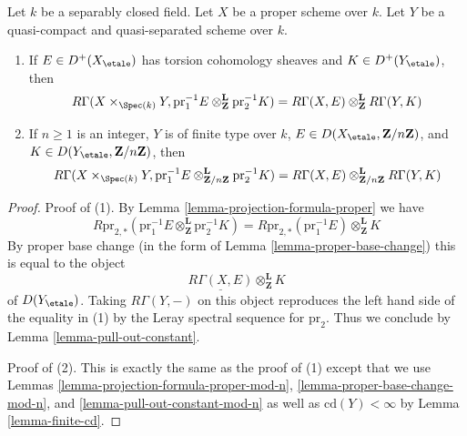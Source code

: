 \begin{lemma}
\label{lemma-kunneth-one-proper}
Let $k$ be a separably closed field. Let $X$ be a proper scheme over $k$.
Let $Y$ be a quasi-compact and quasi-separated scheme over $k$.
\begin{enumerate}
\item If $E \in D^+(X_\etale)$ has torsion cohomology sheaves and
$K \in D^+(Y_\etale)$, then
$$
R\Gamma(X \times_{\Spec(k)} Y,
\text{pr}_1^{-1}E
\otimes_\mathbf{Z}^\mathbf{L}
\text{pr}_2^{-1}K
)
=
R\Gamma(X, E)
\otimes_\mathbf{Z}^\mathbf{L}
R\Gamma(Y, K)
$$
\item If $n \geq 1$ is an integer, $Y$ is of finite type over $k$,
$E \in D(X_\etale, \mathbf{Z}/n\mathbf{Z})$, and
$K \in D(Y_\etale, \mathbf{Z}/n\mathbf{Z})$, then
$$
R\Gamma(X \times_{\Spec(k)} Y,
\text{pr}_1^{-1}E
\otimes_{\mathbf{Z}/n\mathbf{Z}}^\mathbf{L}
\text{pr}_2^{-1}K
)
=
R\Gamma(X, E)
\otimes_{\mathbf{Z}/n\mathbf{Z}}^\mathbf{L}
R\Gamma(Y, K)
$$
\end{enumerate}
\end{lemma}

\begin{proof}
Proof of (1). By Lemma \ref{lemma-projection-formula-proper} we have
$$
R\text{pr}_{2, *}(
\text{pr}_1^{-1}E
\otimes_\mathbf{Z}^\mathbf{L}
\text{pr}_2^{-1}K) =
R\text{pr}_{2, *}(\text{pr}_1^{-1}E)
\otimes_\mathbf{Z}^\mathbf{L}
K
$$
By proper base change (in the form of Lemma \ref{lemma-proper-base-change})
this is equal to the object
$$
\underline{R\Gamma(X, E)}
\otimes_\mathbf{Z}^\mathbf{L}
K
$$
of $D(Y_\etale)$. Taking $R\Gamma(Y, -)$ on this object reproduces the
left hand side of the equality in (1) by the Leray spectral sequence
for $\text{pr}_2$. Thus we conclude by
Lemma \ref{lemma-pull-out-constant}.

\medskip\noindent
Proof of (2). This is exactly the same as the proof of (1)
except that we use Lemmas \ref{lemma-projection-formula-proper-mod-n},
\ref{lemma-proper-base-change-mod-n}, and
\ref{lemma-pull-out-constant-mod-n} as well as
$\text{cd}(Y) < \infty$ by Lemma \ref{lemma-finite-cd}.
\end{proof}
